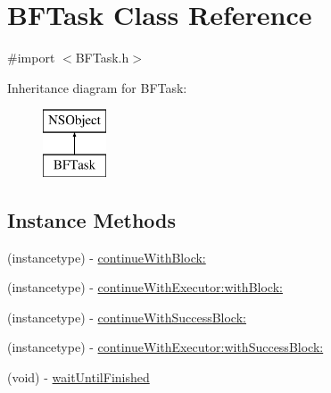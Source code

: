 \hypertarget{interface_b_f_task}{}\section{B\+F\+Task Class Reference}
\label{interface_b_f_task}


{\ttfamily \#import $<$B\+F\+Task.\+h$>$}

Inheritance diagram for B\+F\+Task\+:\begin{figure}[H]
\begin{center}
\leavevmode
\includegraphics[height=2.000000cm]{interface_b_f_task}
\end{center}
\end{figure}
\subsection*{Instance Methods}
\begin{DoxyCompactItemize}
\item 
(instancetype) -\/ \hyperlink{interface_b_f_task_a2a365f99ecb75cc9309ec06bc0486340}{continue\+With\+Block\+:}
\item 
(instancetype) -\/ \hyperlink{interface_b_f_task_ac54630598ad15d751cc8a541c71043a9}{continue\+With\+Executor\+:with\+Block\+:}
\item 
(instancetype) -\/ \hyperlink{interface_b_f_task_ad898327275b645d21c9c06dfb1f05d83}{continue\+With\+Success\+Block\+:}
\item 
(instancetype) -\/ \hyperlink{interface_b_f_task_a350a8b82dfce94182299c94a7ec6eba4}{continue\+With\+Executor\+:with\+Success\+Block\+:}
\item 
(void) -\/ \hyperlink{interface_b_f_task_af2a6abc83d1dac02cb7ee49265a5eeed}{wait\+Until\+Finished}
\end{DoxyCompactItemize}
